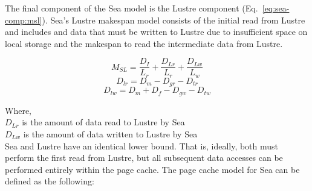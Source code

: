       The final component of the Sea model is the Lustre component
      (Eq.~\ref{eq:sea-comp:msl}). Sea's Lustre makespan model consists of the
      initial read from Lustre and includes and data that must be written to
      Lustre due to insufficient space on local storage and the makespan to read
      the intermediate data from Lustre.

      \begin{equation}\label{eq:sea-comp:msl}
          M_{SL} = \frac{D_{I}}{L_{r}} + \frac{D_{Lr}}{L_{r}} + \frac{D_{Lw}}{L_{w}}
      \end{equation}
      \begin{equation*}\label{eq:sea-comp:dlr}
          D_{lr} = D_{m} - D_{gr} - D_{tr}
      \end{equation*}
      \begin{equation*}\label{eq:sea-comp:dlw}
          D_{lw} = D_{m} + D_{f} - D_{gw} - D_{tw}
      \end{equation*}

      Where, \\
      $D_{Lr}$ is the amount of data read to Lustre by Sea \\
      $D_{Lw}$ is the amount of data written to Lustre by Sea \\


      Sea and Lustre have an identical lower bound. That is, ideally, both must
      perform the first read from Lustre, but all subsequent data accesses can
      be performed entirely within the page cache. The page cache model for Sea
      can be defined as the following:

